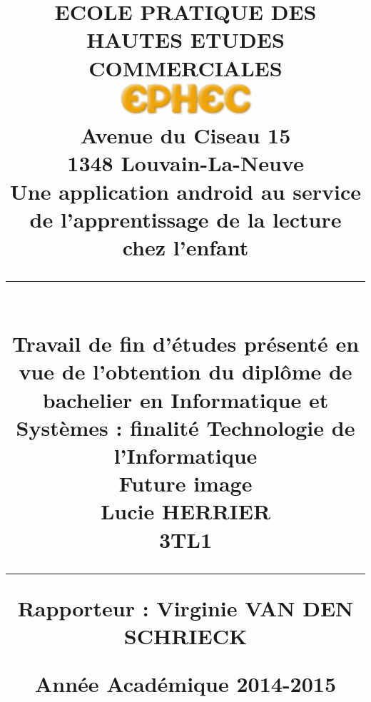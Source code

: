 \title{
\parbox{15cm}
{	
	\begin{center}
	\large ECOLE PRATIQUE DES HAUTES ETUDES COMMERCIALES\\
	\vspace{.5cm}
	\includegraphics[width=5cm]{ephec.png}\\
	Avenue du Ciseau 15\\
	1348 Louvain-La-Neuve\\
	\vspace{2cm}
	\sf\bfseries\Huge
	Une application android au service de l'apprentissage de la lecture chez l'enfant 
	\rule{15cm}{1pt}\\
	\normalsize\mdseries Travail de fin d'études présenté en vue de l'obtention du diplôme de bachelier en Informatique et Systèmes : finalité Technologie de l'Informatique\\
	\vspace{1cm}
	Future image\\
	\vspace{.5cm}
	\bfseries\LARGE
		Lucie HERRIER\\ \Large 3TL1
	\rule{15cm}{1pt}
	\end{center}
	\vspace{1cm}
	\bf\normalsize Rapporteur : Virginie VAN DEN SCHRIECK
	\vspace{4cm}
	\begin{center}
	\Large Année Académique 2014-2015
	\end{center}
}} 
